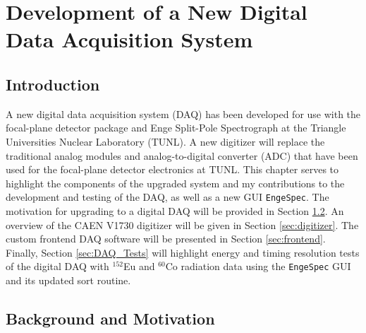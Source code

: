 \chapter{Development of a New Digital Data Acquisition System}
\label{ch:DAQ}


\section{Introduction}

A new digital data acquisition system (DAQ) has been developed for use with the focal-plane detector package \cite{Marshall2019} and Enge Split-Pole Spectrograph at the Triangle Universities Nuclear Laboratory (TUNL). A new digitizer will replace the traditional analog modules and analog-to-digital converter (ADC) that have been used for the focal-plane detector electronics at TUNL. This chapter serves to highlight the components of the upgraded system and my contributions to the development and testing of the DAQ, as well as a new GUI \texttt{EngeSpec}. The motivation for upgrading to a digital DAQ will be provided in Section \ref{sec:motivation}. An overview of the CAEN V1730 digitizer will be given in Section \ref{sec:digitizer}. The custom frontend DAQ software will be presented in Section \ref{sec:frontend}. %
Finally, Section \ref{sec:DAQ_Tests} will highlight energy and timing resolution tests of the digital DAQ with $^{152}$Eu and $^{60}$Co radiation data using the \texttt{EngeSpec} GUI and its updated sort routine.



\section{Background and Motivation} \label{sec:motivation}


